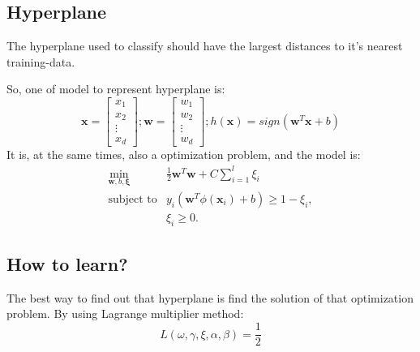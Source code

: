 \documentclass{article}
\begin{document}
\subsection{Hyperplane}
\label{sec:svm:hyperplane}

The hyperplane used to classify should have the largest distances to it's nearest training-data.

So, one of model to represent hyperplane is:
$$
\mathbf{x} = \left[\begin{array}{c} x_1 \\ x_2 \\ \vdots \\ x_d \end{array}\right];
\mathbf{w} = \left[\begin{array}{c} w_1 \\ w_2 \\ \vdots \\ w_d \end{array}\right];
h(\mathbf{x}) = sign\left(\mathbf{w}^T\mathbf{x}+b\right)
$$
It is, at the same times, also a optimization problem, and the model\cite{svm1} is:
\begin{equation}
\label{eq:hyp:op}
\begin{array}{rl}
  \min\limits_{\mathbf{w},b,\mathbf{\xi}} & \frac{1}{2}\mathbf{w}^T\mathbf{w}+C\sum\limits_{i=1}^{l}\xi_i\\
  \text{subject to} & y_i\left(\mathbf{w}^T\phi(\mathbf{x}_i)+b\right) \geq 1 - \xi_i,\\
                                          & \xi_i \geq 0.
\end{array}
\end{equation}

\subsection{How to learn?}
\label{sec:svm:how}

The best way to find out that hyperplane is find the solution of that optimization problem.
By using Lagrange multiplier method\cite{GraphML1}:
\begin{equation}
  \label{eq:lagrange-multiplier-method}
  L(\omega,\gamma,\xi,\alpha,\beta) =
  \frac{1}{2}
\end{equation}



\printbibliography
\end{document}
